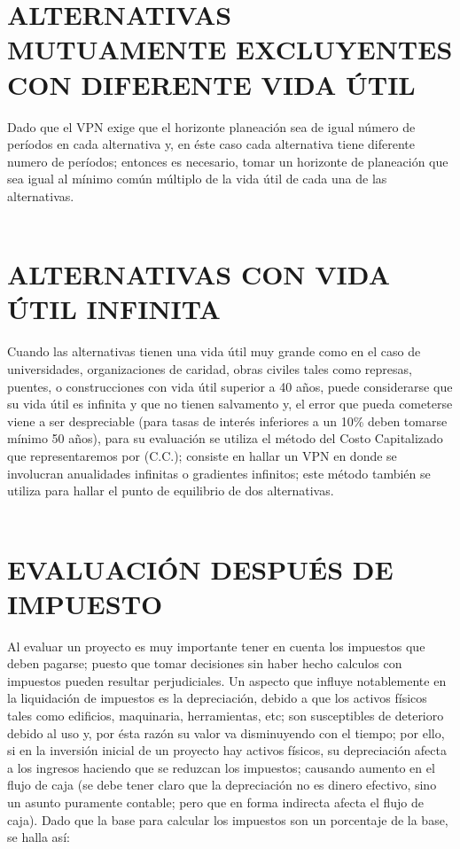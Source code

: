 \section{ALTERNATIVAS MUTUAMENTE EXCLUYENTES CON DIFERENTE VIDA ÚTIL}

Dado que el VPN exige que el horizonte planeación sea de igual número de períodos en cada alternativa y, en éste caso cada alternativa tiene diferente numero de períodos; entonces es necesario, tomar un horizonte de planeación que sea igual al mínimo común múltiplo de la vida útil de cada una de las alternativas.\\
\\


\section{ALTERNATIVAS CON VIDA ÚTIL INFINITA}

Cuando las alternativas tienen una vida útil muy grande como en el caso de universidades, organizaciones de caridad, obras civiles tales como represas, puentes, o construcciones con vida útil superior a 40 años, puede considerarse que su vida útil es infinita y que no tienen salvamento y, el error que pueda cometerse viene a ser despreciable (para tasas de interés inferiores a un 10\% deben tomarse mínimo 50 años), para su evaluación se utiliza el método del Costo Capitalizado que representaremos por (C.C.); consiste en hallar un VPN en donde se involucran anualidades infinitas o gradientes infinitos; este método también se utiliza para hallar el punto de equilibrio de dos alternativas.\\
\\


\section{EVALUACIÓN DESPUÉS DE IMPUESTO}

Al evaluar un proyecto es muy importante tener en cuenta los impuestos que deben pagarse; puesto que tomar decisiones sin haber hecho calculos con impuestos pueden resultar perjudiciales.
Un aspecto que influye notablemente en la liquidación de impuestos es la depreciación, debido a que los activos físicos tales como edificios, maquinaria, herramientas, etc; son susceptibles de deterioro debido al uso y, por ésta razón su valor va disminuyendo con el tiempo; por ello, si en la inversión inicial de un proyecto hay activos físicos, su depreciación afecta a los ingresos haciendo que se reduzcan los impuestos; causando aumento en el flujo de caja (se debe tener claro que la depreciación no es dinero efectivo, sino un asunto puramente contable; pero que en forma indirecta afecta el flujo de caja). Dado que la base para calcular los impuestos son un porcentaje de la base, se halla así:\\

